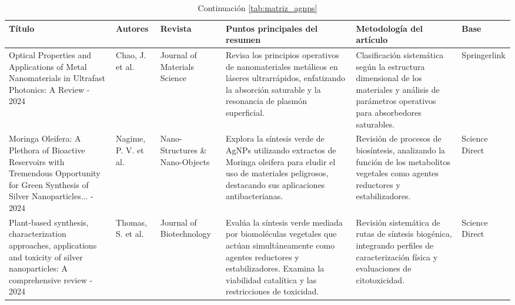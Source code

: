 \documentclass[pdflatex,sn-mathphys-num]{sn-jnl}
\theoremstyle{thmstyleone}%
\theoremstyle{thmstyletwo}%
\theoremstyle{thmstylethree}%
\begin{document}
\newpage
{}
\begin{landscape}
	\thispagestyle{empty}

	\begin{table}[htbp!]
		\caption{Continuación \cref{tab:matriz_agnps}}
		\begin{tabularx}{\linewidth}{
				>{\raggedright\arraybackslash\hsize=1.0\hsize}X
				>{\raggedright\arraybackslash\hsize=0.8\hsize}X
				>{\raggedright\arraybackslash\hsize=1.0\hsize}X
				>{\raggedright\arraybackslash\hsize=1.6\hsize}X
				>{\raggedright\arraybackslash\hsize=1.1\hsize}X
				>{\raggedright\arraybackslash\hsize=0.5\hsize}X
			}
			\toprule
			Título & Autores & Revista & Puntos principales del resumen &
			Metodología del artículo & Base \\
			\midrule
			Optical Properties and Applications of Metal Nanomaterials in Ultrafast
			Photonics: A Review - 2024 \cite{chaoOpticalPropertiesApplications2024} &
			Chao, J. et al. &
			Journal of Materials Science &
			Revisa los principios operativos de nanomateriales metálicos en láseres
			ultrarrápidos, enfatizando la absorción saturable y la resonancia de
			plasmón superficial. &
			Clasificación sistemática según la estructura dimensional de los materiales
			y análisis de parámetros operativos para absorbedores saturables. &
			Springerlink \\
			\addlinespace
			Moringa Oleifera: A Plethora of Bioactive Reservoirs with Tremendous
			Opportunity for Green Synthesis of Silver Nanoparticles...
			- 2024 \cite{nagimeMoringaOleiferaPlethora2024} &
			Nagime, P. V. et al. &
			Nano-Structures \& Nano-Objects &
			Explora la síntesis verde de AgNPs utilizando extractos de Moringa oleifera
			para eludir el uso de materiales peligrosos, destacando sus aplicaciones
			antibacterianas. &
			Revisión de procesos de biosíntesis, analizando la función de los
			metabolitos vegetales como agentes reductores y estabilizadores. &
			Science Direct \\
			\addlinespace
			Plant-based synthesis, characterization approaches, applications and
			toxicity of silver nanoparticles: A comprehensive review - 2024
			\cite{thomasPlantbasedSynthesisCharacterization2024} &
			Thomas, S. et al. &
			Journal of Biotechnology &
			Evalúa la síntesis verde mediada por biomoléculas vegetales que
			actúan simultáneamente como agentes reductores y estabilizadores.
			Examina la viabilidad catalítica y las restricciones de toxicidad. &
			Revisión sistemática de rutas de síntesis biogénica, integrando
			perfiles de caracterización física y evaluaciones de citotoxicidad. &
			Science Direct \\
			\bottomrule
		\end{tabularx}
	\end{table}
\end{landscape}

\restoregeometry
\newpage


\end{document}
